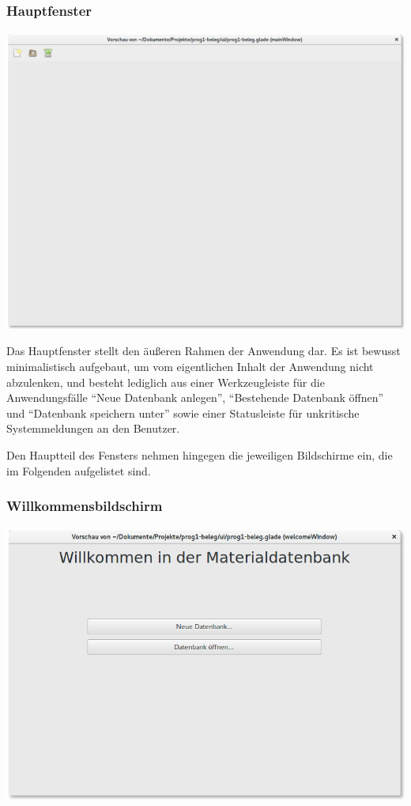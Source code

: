 \subsubsection{Hauptfenster}
\begin{center}
\noindent\includegraphics[width=150mm,keepaspectratio]{images/04-hauptfenster.png}
\end{center}

Das Hauptfenster stellt den äußeren Rahmen der Anwendung dar. Es ist bewusst minimalistisch aufgebaut, um vom eigentlichen
Inhalt der Anwendung nicht abzulenken, und besteht lediglich aus einer Werkzeugleiste für die Anwendungsfälle
``Neue Datenbank anlegen'', ``Bestehende Datenbank öffnen'' und ``Datenbank speichern unter'' sowie einer Statusleiste
für unkritische Systemmeldungen an den Benutzer.

Den Hauptteil des Fensters nehmen hingegen die jeweiligen Bildschirme ein, die im Folgenden aufgelistet sind.

\subsubsection{Willkommensbildschirm}
\begin{center}
\noindent\includegraphics[width=150mm,keepaspectratio]{images/05-willkommensbildschirm.png}
\end{center}

